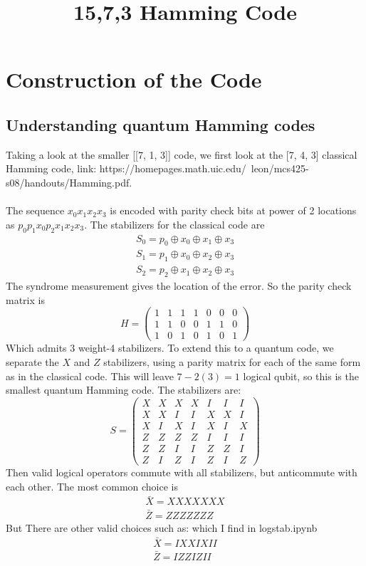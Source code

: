 \documentclass{article}
\title{15,7,3 Hamming Code}
\begin{document}
\section{Construction of the Code}

\subsection{Understanding quantum Hamming codes}
Taking a look at the smaller [[7, 1, 3]] code, we first look at the [7, 4, 3] classical Hamming code, link: https://homepages.math.uic.edu/~leon/mcs425-s08/handouts/Hamming.pdf. \\\\
The sequence $x_0x_1x_2x_3$ is encoded with parity check bits at power of 2 locations as $p_0p_1x_0p_2x_1x_2x_3$. The stabilizers for the classical code are 
\begin{align*}
    S_0 = p_0 \oplus x_0 \oplus x_1 \oplus x_3 \\
    S_1 = p_1 \oplus x_0 \oplus x_2 \oplus x_3 \\
    S_2 = p_2 \oplus x_1 \oplus x_2 \oplus x_3
\end{align*}
The syndrome measurement gives the location of the error. So the parity check matrix is 
\[H = \begin{pmatrix}
    1 & 1 & 1 & 1 & 0 & 0 & 0 \\
    1 & 1 & 0 & 0 & 1 & 1 & 0 \\
    1 & 0 & 1 & 0 & 1 & 0 & 1
\end{pmatrix}\]
Which admits 3 weight-4 stabilizers. To extend this to a quantum code, we separate the $X$ and $Z$ stabilizers, using a parity matrix for each of the same form as in the classical code. This will leave $7 - 2(3) = 1$ logical qubit, so this is the smallest quantum Hamming code. The stabilizers are:
\[S = \begin{pmatrix}
    X & X & X & X & I & I & I \\
    X & X & I & I & X & X & I \\
    X & I & X & I & X & I & X \\
    Z & Z & Z & Z & I & I & I \\
    Z & Z & I & I & Z & Z & I \\
    Z & I & Z & I & Z & I & Z
\end{pmatrix}\]
Then valid logical operators commute with all stabilizers, but anticommute with each other. The most common choice is 
\begin{align*}
    \bar X = XXXXXXX \\
    \bar Z = ZZZZZZZ
\end{align*}
But There are other valid choices such as: which I find in logstab.ipynb
\begin{align*}
    \bar X = IXXIXII \\
    \bar Z = IZZIZII
\end{align*}
\end{document}
